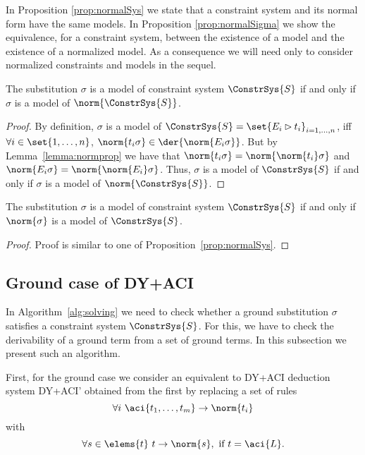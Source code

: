 In Proposition \ref{prop:normalSys}  we state that a  constraint system and its normal form have the same models. 
In Proposition \ref{prop:normalSigma} we show the equivalence, for a constraint system,  
between the existence of a model and the existence of a  normalized model. 
As a consequence we will need  only to consider  normalized constraints and models in the sequel.

\begin{prop}\label{prop:normalSys}
	The substitution $\sigma$ is a model of constraint system $\ConstrSys{S}$ if and only if $\sigma$ is a model of $\norm{\ConstrSys{S}}$.
\begin{proof}
	By definition, 
	$\sigma$ is a model of $\ConstrSys{S}=\set{E_i \rhd t_i}_{i=1, \dots, n}$, 
	iff $\forall i\in \set{1,\dots,n}$, $\norm{t_i\sigma} \in \der{\norm{E_i \sigma}}$. 
	But by Lemma~\ref{lemma:normprop} we have that  $\norm{t_i\sigma}=\norm{\norm{t_i}\sigma}$ and $\norm{E_i \sigma}=\norm{\norm{E_i} \sigma}$. 
	Thus, $\sigma$ is a model of ${\ConstrSys{S}}$ if and only if $\sigma$ is a model of $\norm{\ConstrSys{S}}$.
\end{proof}

\end{prop}



\begin{prop}\label{prop:normalSigma}
	The substitution $\sigma$ is a model of constraint system $\ConstrSys{S}$ if and only if $\norm{\sigma}$ is a model of $\ConstrSys{S}$.
\begin{proof}
	Proof is similar to one of Proposition~\ref{prop:normalSys}.
\end{proof}

\end{prop}






\subsection{Ground case of DY+ACI}\label{subs:groundcase}
In Algorithm~\ref{alg:solving} we need to check whether a ground substitution $\sigma$ satisfies a constraint system $\ConstrSys{S}$. For this, we have to check 
the derivability of a ground term from a set of ground terms. In this subsection we  present such an algorithm.

First, for the ground case we consider an  equivalent to DY+ACI deduction system DY+ACI' obtained from the first by replacing a set of rules 
 $$\forall i  \  \aci{{t_1, \dots, t_m}} \rightarrow \norm{t_i}$$
with   
 $$ \forall s\in\elems{t} \ {t} \rightarrow \norm{s}, \mbox{ if }  t=\aci{L}. $$



